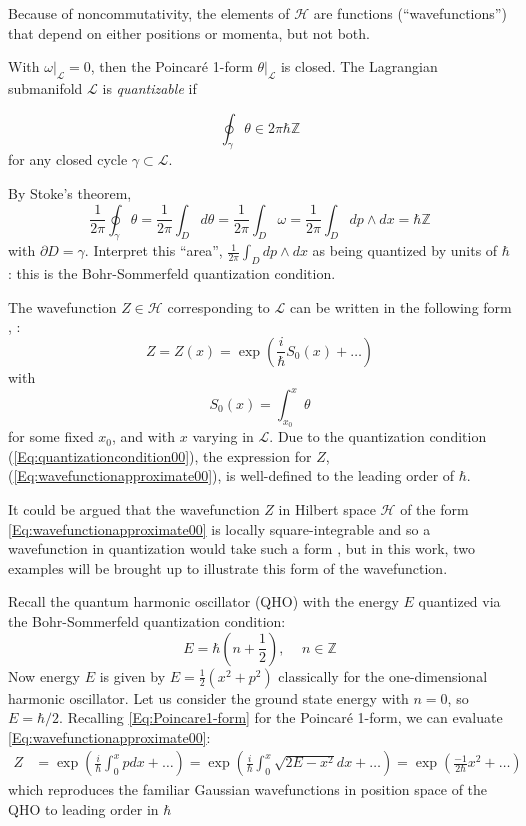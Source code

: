\documentclass[a4paper,titlepage,twoside]{book}
\begin{document}
Because of noncommutativity, the elements of $\mathcal{H}$ are functions (``wavefunctions'') that depend on either positions or momenta, but not both.  

With $\left. \omega \right|_{\mathcal{L}} =0$, then the Poincar\'{e} 1-form $\left. \theta \right|_{\mathcal{L}}$ is closed.  The Lagrangian submanifold $\mathcal{L}$ is \emph{quantizable} if 

\begin{equation}
  \oint_{\gamma} \theta \in 2\pi \hbar \mathbb{Z} \label{Eq:quantizationcondition00}
\end{equation}
for any closed cycle $\gamma \subset \mathcal{L}$.  

By Stoke's theorem, 
\[
\frac{1}{2\pi} \oint_{\gamma} \theta = \frac{1}{2\pi} \int_D d\theta  =\frac{1}{2\pi} \int_D \omega = \frac{1}{2\pi} \int_D dp \wedge dx = \hbar \mathbb{Z}
\]
with $\partial D = \gamma$.  Interpret this ``area'', $\frac{1}{2\pi} \int_D dp\wedge dx$ as being quantized by units of $\hbar$: this is the Bohr-Sommerfeld quantization condition.  

The wavefunction $Z \in \mathcal{H}$ corresponding to $\mathcal{L}$ can be written in the following form \cite{GukovSaberi2012}, \cite{DimofteGukov2010}:
\begin{equation}
  Z = Z(x) = \exp{ \left( \frac{i}{ \hbar} S_0(x) + \dots \right) } 
\label{Eq:wavefunctionapproximate00}
\end{equation}
with 
\begin{equation}
  S_0(x) = \int_{x_0}^{x} \theta
\end{equation}
for some fixed $x_0$, and with $x$ varying in $\mathcal{L}$.  Due to the quantization condition (\ref{Eq:quantizationcondition00}), the expression for $Z$, (\ref{Eq:wavefunctionapproximate00}), is well-defined to the leading order of $\hbar$.

It could be argued that the wavefunction $Z$ in Hilbert space $\mathcal{H}$ of the form \eqref{Eq:wavefunctionapproximate00} is locally square-integrable and so a wavefunction in quantization would take such a form \cite{GukovSaberi2012}, but in this work, two examples will be brought up to illustrate this form of the wavefunction.

Recall the quantum harmonic oscillator (QHO) with the energy $E$ quantized via the Bohr-Sommerfeld quantization condition:
\[
E = \hbar \left(n + \frac{1}{2} \right), \quad \, n \in \mathbb{Z}
\]
Now energy $E$ is given by $E = \frac{1}{2} ( x^2 + p^2)$ classically for the one-dimensional harmonic oscillator.  Let us consider the ground state energy with $n=0$, so $E = \hbar/2$.  Recalling \eqref{Eq:Poincare1-form} for the Poincar\'{e} 1-form, we can evaluate \eqref{Eq:wavefunctionapproximate00}:
\[
\begin{aligned}
Z & = \exp{ \left( \frac{i}{ \hbar} \int_0^x p dx + \dots \right) } = \exp{ \left( \frac{i}{ \hbar} \int_0^x \sqrt{ 2 E - x^2 } dx + \dots \right) } = \exp{ \left( \frac{-1}{ 2 \hbar} x^2  + \dots \right) }
\end{aligned}
\]
which reproduces the familiar Gaussian wavefunctions in position space of the QHO to leading order in $\hbar$
\end{document}
